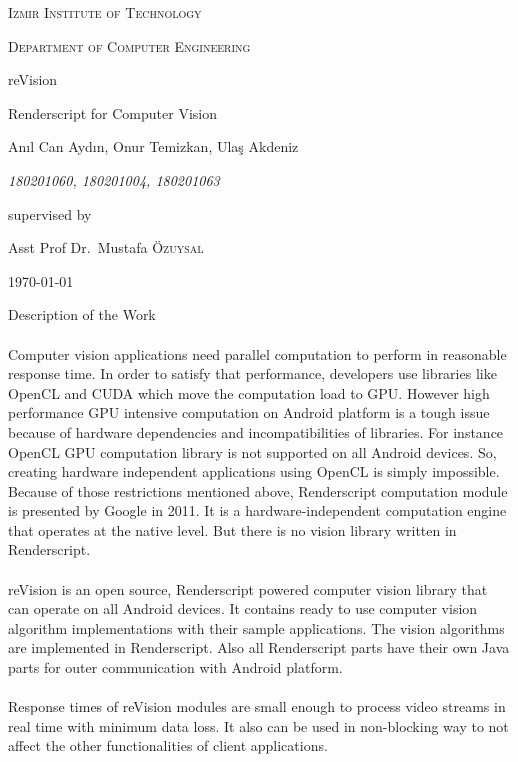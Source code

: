\documentclass[12pt, a4paper]{article} \pagenumbering{gobble}
\begin{document}
  \begin{titlepage}
    \centering
    {\scshape\Large Izmir Institute of Technology\par}
    {\scshape\large Department of Computer Engineering\par}
    \vspace{2.5cm}
	  {\huge reVision\par}
	  \vspace{1cm}
	  {\Large Renderscript for Computer Vision\par}
	\vspace{2cm}
	{\Large An{\i}l Can Ayd{\i}n, Onur Temizkan, Ula\c{s} Akdeniz\par}
  {\itshape180201060, 180201004, 180201063\par}
	\vfill
	supervised by\par
	\large{Asst Prof Dr.~Mustafa \textsc{\"{O}zuysal}}

	\vfill

	{\large \today\par}
  \end{titlepage}

\newpage
\begin{section}{Description of the Work}
\paragraph{}{%
  Computer vision applications need parallel computation to perform in reasonable response time.
  In order to satisfy that performance, developers use libraries like OpenCL and CUDA which move the computation
  load to GPU. However high performance GPU intensive computation on Android platform is a tough issue because
  of hardware dependencies and incompatibilities of libraries. For instance OpenCL GPU computation library is not
  supported on all Android devices. So, creating hardware independent applications using OpenCL is simply impossible.
  Because of those restrictions mentioned above, Renderscript computation module is presented by Google in 2011.
  It is ﻿a hardware-independent computation engine that operates at the native level. But there is no vision library
  written in Renderscript.
}
\paragraph{}{%
  reVision is an open source, Renderscript powered computer vision library that can operate on all Android devices.
  It contains ready to use computer vision algorithm implementations with their sample applications. The vision
  algorithms are implemented in Renderscript. Also all Renderscript parts have their own Java parts for outer
  communication with Android platform.
}
\paragraph{}{Response times of reVision modules are small enough to process video streams in real time with minimum data loss. It also can be used in non-blocking way to not affect the other functionalities of client applications.}
\end{section}
\end{document}
